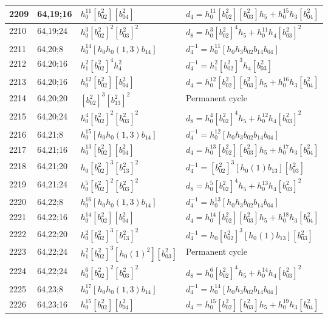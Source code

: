 \documentclass{article}
\begin{document}
\begin{longtable}{|l|l|>{\raggedright\arraybackslash}p{6cm}|>{\raggedright\arraybackslash}p{6cm}|}
\hline
2209 & 64,19;16 & $h_0^{11}[b_{02}^2][b_{04}^2]$ &$d_{4}=h_0^{11}[b_{02}^2][b_{03}^2]h_5 + h_0^{15}h_3[b_{04}^2]$\\
\hline
2210 & 64,19;24 & $h_0^3[b_{02}^2]^2[b_{03}^2]^2$ &$d_{8}=h_0^3[b_{02}^2]^4h_5 + h_0^{11}h_4[b_{03}^2]^2$\\
\hline
2211 & 64,20;8 & $h_0^{14}[h_0h_0(1, 3)b_{14}]$ & $d_{4}^{-1}=h_0^{11}[h_0h_3b_{02}b_{14}b_{04}]$\\
\hline
2212 & 64,20;16 & $h_1^2[b_{02}^2]^4h_4^2$ & $d_{4}^{-1}=h_1^2[b_{02}^2]^3h_4[b_{03}^2]$\\
2213 & 64,20;16 & $h_0^{12}[b_{02}^2][b_{04}^2]$ &$d_{4}=h_0^{12}[b_{02}^2][b_{03}^2]h_5 + h_0^{16}h_3[b_{04}^2]$\\
\hline
2214 & 64,20;20 & $[b_{02}^2]^3[b_{13}^2]^2$ & Permanent cycle\\
\hline
2215 & 64,20;24 & $h_0^4[b_{02}^2]^2[b_{03}^2]^2$ &$d_{8}=h_0^4[b_{02}^2]^4h_5 + h_0^{12}h_4[b_{03}^2]^2$\\
\hline
2216 & 64,21;8 & $h_0^{15}[h_0h_0(1, 3)b_{14}]$ & $d_{4}^{-1}=h_0^{12}[h_0h_3b_{02}b_{14}b_{04}]$\\
\hline
2217 & 64,21;16 & $h_0^{13}[b_{02}^2][b_{04}^2]$ &$d_{4}=h_0^{13}[b_{02}^2][b_{03}^2]h_5 + h_0^{17}h_3[b_{04}^2]$\\
\hline
2218 & 64,21;20 & $h_0[b_{02}^2]^3[b_{13}^2]^2$ & $d_{4}^{-1}=[b_{02}^2]^3[h_0(1)b_{13}][b_{03}^2]$\\
\hline
2219 & 64,21;24 & $h_0^5[b_{02}^2]^2[b_{03}^2]^2$ &$d_{8}=h_0^5[b_{02}^2]^4h_5 + h_0^{13}h_4[b_{03}^2]^2$\\
\hline
2220 & 64,22;8 & $h_0^{16}[h_0h_0(1, 3)b_{14}]$ & $d_{4}^{-1}=h_0^{13}[h_0h_3b_{02}b_{14}b_{04}]$\\
\hline
2221 & 64,22;16 & $h_0^{14}[b_{02}^2][b_{04}^2]$ &$d_{4}=h_0^{14}[b_{02}^2][b_{03}^2]h_5 + h_0^{18}h_3[b_{04}^2]$\\
\hline
2222 & 64,22;20 & $h_0^2[b_{02}^2]^3[b_{13}^2]^2$ & $d_{4}^{-1}=h_0[b_{02}^2]^3[h_0(1)b_{13}][b_{03}^2]$\\
\hline
2223 & 64,22;24 & $h_1^2[b_{02}^2]^3[h_0(1)^2][b_{03}^2]$ & Permanent cycle\\
2224 & 64,22;24 & $h_0^6[b_{02}^2]^2[b_{03}^2]^2$ &$d_{8}=h_0^6[b_{02}^2]^4h_5 + h_0^{14}h_4[b_{03}^2]^2$\\
\hline
2225 & 64,23;8 & $h_0^{17}[h_0h_0(1, 3)b_{14}]$ & $d_{4}^{-1}=h_0^{14}[h_0h_3b_{02}b_{14}b_{04}]$\\
\hline
2226 & 64,23;16 & $h_0^{15}[b_{02}^2][b_{04}^2]$ &$d_{4}=h_0^{15}[b_{02}^2][b_{03}^2]h_5 + h_0^{19}h_3[b_{04}^2]$\\

\end{longtable}
\end{document}
